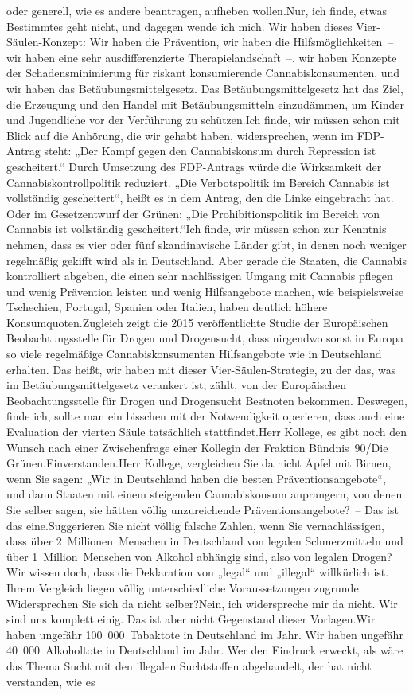 \documentclass{article}
\begin{document}
oder generell, wie es andere beantragen, aufheben wollen.Nur, ich finde, etwas Bestimmtes geht nicht, und dagegen wende ich mich. Wir haben dieses Vier-Säulen-Konzept: Wir haben die Prävention, wir haben die Hilfsmöglichkeiten – wir haben eine sehr ausdifferenzierte Therapielandschaft –, wir haben Konzepte der Schadensminimierung für riskant konsumierende Cannabiskonsumenten, und wir haben das Betäubungsmittelgesetz. Das Betäubungsmittelgesetz hat das Ziel, die Erzeugung und den Handel mit Betäubungsmitteln einzudämmen, um Kinder und Jugendliche vor der Verführung zu schützen.Ich finde, wir müssen schon mit Blick auf die Anhörung, die wir gehabt haben, widersprechen, wenn im FDP-Antrag steht: „Der Kampf gegen den Cannabiskonsum durch Repression ist gescheitert.“ Durch Umsetzung des FDP-Antrags würde die Wirksamkeit der Cannabiskontrollpolitik reduziert. „Die Verbotspolitik im Bereich Cannabis ist vollständig gescheitert“, heißt es in dem Antrag, den die Linke eingebracht hat. Oder im Gesetzentwurf der Grünen: „Die Prohibitionspolitik im Bereich von Cannabis ist vollständig gescheitert.“Ich finde, wir müssen schon zur Kenntnis nehmen, dass es vier oder fünf skandinavische Länder gibt, in denen noch weniger regelmäßig gekifft wird als in Deutschland. Aber gerade die Staaten, die Cannabis kontrolliert abgeben, die einen sehr nachlässigen Umgang mit Cannabis pflegen und wenig Prävention leisten und wenig Hilfsangebote machen, wie beispielsweise Tschechien, Portugal, Spanien oder Italien, haben deutlich höhere Konsumquoten.Zugleich zeigt die 2015 veröffentlichte Studie der Europäischen Beobachtungsstelle für Drogen und Drogensucht, dass nirgendwo sonst in Europa so viele regelmäßige Cannabiskonsumenten Hilfsangebote wie in Deutschland erhalten. Das heißt, wir haben mit dieser Vier-Säulen-Strategie, zu der das, was im Betäubungsmittelgesetz verankert ist, zählt, von der Europäischen Beobachtungsstelle für Drogen und Drogensucht Bestnoten bekommen. Deswegen, finde ich, sollte man ein bisschen mit der Notwendigkeit operieren, dass auch eine Evaluation der vierten Säule tatsächlich stattfindet.Herr Kollege, es gibt noch den Wunsch nach einer Zwischenfrage einer Kollegin der Fraktion Bündnis 90/Die Grünen.Einverstanden.Herr Kollege, vergleichen Sie da nicht Äpfel mit Birnen, wenn Sie sagen: „Wir in Deutschland haben die besten Präventionsangebote“, und dann Staaten mit einem steigenden Cannabiskonsum anprangern, von denen Sie selber sagen, sie hätten völlig unzureichende Präventionsangebote? – Das ist das eine.Suggerieren Sie nicht völlig falsche Zahlen, wenn Sie vernachlässigen, dass über 2 Millionen Menschen in Deutschland von legalen Schmerzmitteln und über 1 Million Menschen von Alkohol abhängig sind, also von legalen Drogen? Wir wissen doch, dass die Deklaration von „legal“ und „illegal“ willkürlich ist. Ihrem Vergleich liegen völlig unterschiedliche Voraussetzungen zugrunde. Widersprechen Sie sich da nicht selber?Nein, ich widerspreche mir da nicht. Wir sind uns komplett einig. Das ist aber nicht Gegenstand dieser Vorlagen.Wir haben ungefähr 100 000 Tabaktote in Deutschland im Jahr. Wir haben ungefähr 40 000 Alkoholtote in Deutschland im Jahr. Wer den Eindruck erweckt, als wäre das Thema Sucht mit den illegalen Suchtstoffen abgehandelt, der hat nicht verstanden, wie es 
\end{document}
